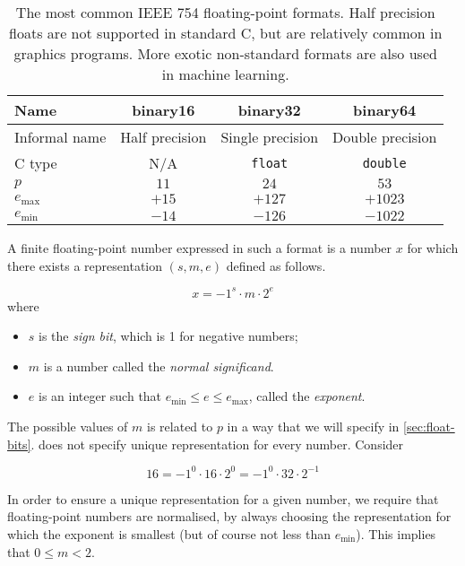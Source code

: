 \begin{table}
  \centering
  \begin{tabular}{|l||c|c|c|}
    \hline
    Name & binary16 & binary32 & binary64 \\\hline
    Informal name & Half precision & Single precision & Double precision \\\hline
    C type & N/A & \texttt{float} & \texttt{double} \\\hline
    $p$ & $11$ & $24$ & $53$ \\\hline
    $e_{\text{max}}$ & $+15$ & $+127$ & $+1023$ \\\hline
    $e_{\text{min}}$ & $-14$ & $-126$ & $-1022$ \\\hline
  \end{tabular}
  \caption{The most common IEEE 754 floating-point formats.  Half
    precision floats are not supported in standard C, but are
    relatively common in graphics programs.  More exotic non-standard
    formats are also used in machine learning.}
  \label{tab:ieee-formats}
\end{table}

A finite floating-point number expressed in such a format is a number
$x$ for which there exists a representation $(s,m,e)$ defined as
follows.

\begin{definition}
\[
  x = -1^{s} \cdot{} m \cdot{} 2^e
\]
where
\begin{itemize}
\item $s$ is the \emph{sign bit}, which is 1 for negative numbers;
\item $m$ is a number called the \emph{normal significand}.
\item $e$ is an integer such that
  $e_{\text{min}} \leq e \leq e_{\text{max}}$, called the
  \emph{exponent}.
\end{itemize}
\label{def:float-rep}
\end{definition}

The possible values of $m$ is related to $p$ in a way that we will
specify in \cref{sec:float-bits}.   does not
specify unique representation for every number.  Consider

\begin{equation}
  16 = -1^{0}\cdot{} 16\cdot{}2^{0} = -1^{0}\cdot{} 32\cdot{}2^{-1}
\end{equation}

In order to ensure a unique representation for a given number, we
require that floating-point numbers are normalised, by always choosing
the representation for which the exponent is smallest (but of course
not less than $e_{\text{min}}$).  This implies that $0 \leq m < 2$.

